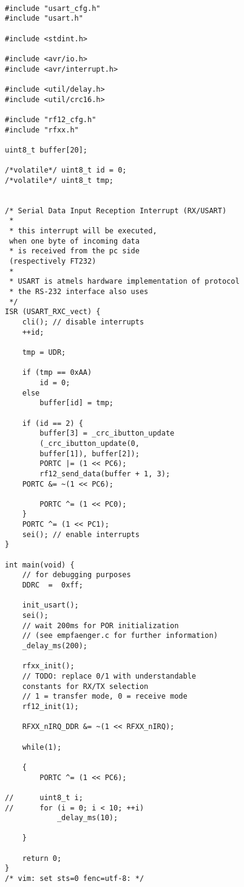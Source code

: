 
\lstset{language=C}
\begin{lstlisting}[caption={Sender.c},frame=tlrb]

#include "usart_cfg.h"
#include "usart.h"

#include <stdint.h>

#include <avr/io.h>
#include <avr/interrupt.h>

#include <util/delay.h>
#include <util/crc16.h>

#include "rf12_cfg.h"
#include "rfxx.h"

uint8_t buffer[20];

/*volatile*/ uint8_t id = 0;
/*volatile*/ uint8_t tmp;


/* Serial Data Input Reception Interrupt (RX/USART)
 *
 * this interrupt will be executed,
 when one byte of incoming data
 * is received from the pc side
 (respectively FT232)
 *
 * USART is atmels hardware implementation of protocol 
 * the RS-232 interface also uses
 */
ISR (USART_RXC_vect) {
	cli(); // disable interrupts
	++id;

	tmp = UDR;

	if (tmp == 0xAA)
		id = 0;
	else 
		buffer[id] = tmp;

	if (id == 2) {
		buffer[3] = _crc_ibutton_update
		(_crc_ibutton_update(0, 
		buffer[1]), buffer[2]);
		PORTC |= (1 << PC6);
		rf12_send_data(buffer + 1, 3);
	PORTC &= ~(1 << PC6);

		PORTC ^= (1 << PC0);
	}
	PORTC ^= (1 << PC1);
	sei(); // enable interrupts
}

int main(void) {
	// for debugging purposes
	DDRC  =  0xff;

	init_usart();
	sei();
	// wait 200ms for POR initialization 
	// (see empfaenger.c for further information)
	_delay_ms(200);

	rfxx_init();
	// TODO: replace 0/1 with understandable 
	constants for RX/TX selection
	// 1 = transfer mode, 0 = receive mode
	rf12_init(1);

	RFXX_nIRQ_DDR &= ~(1 << RFXX_nIRQ);

	while(1);

	{
		PORTC ^= (1 << PC6);

//		uint8_t i;
//		for (i = 0; i < 10; ++i)
			_delay_ms(10);

	}

	return 0;
}
/* vim: set sts=0 fenc=utf-8: */
\end{lstlisting}
